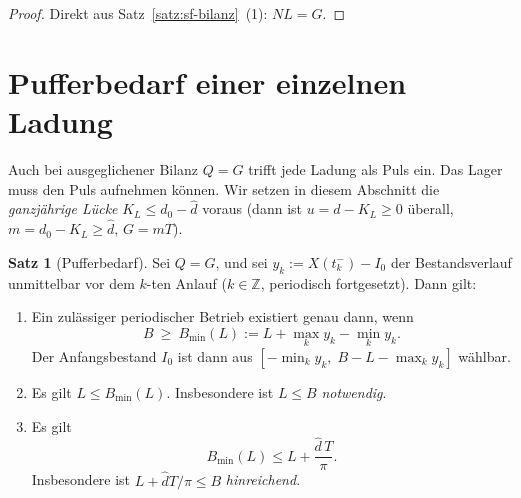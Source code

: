 \documentclass[a4paper, 12pt, twoside, openright]{report}
\providecommand{\dhat}{\hat d}      %
\theoremstyle{definition}
\theoremstyle{definition}
\newtheorem{satz}{Satz}[chapter]
\begin{document}
\begin{proof}
Direkt aus Satz~\ref{satz:sf-bilanz}~(1): $NL=G$.
\end{proof}

\section{Pufferbedarf einer einzelnen Ladung}\label{sec:sf-puffer}

Auch bei ausgeglichener Bilanz $Q=G$ trifft jede Ladung als Puls ein. Das Lager muss
den Puls aufnehmen können. Wir setzen in diesem Abschnitt die \emph{ganzjährige
Lücke} $K_L\le d_0-\dhat$ voraus (dann ist $u=d-K_L\ge0$ überall,
$m=d_0-K_L\ge\dhat$, $G=mT$).

\begin{satz}[Pufferbedarf]\label{satz:sf-puffer}
Sei $Q=G$, und sei $y_k:=X(t_k^-)-I_0$ der Bestandsverlauf unmittelbar vor dem
$k$-ten Anlauf ($k\in\mathbb Z$, periodisch fortgesetzt). Dann gilt:
\begin{enumerate}
  \item Ein zulässiger periodischer Betrieb existiert genau dann, wenn
    \begin{equation}
      B\ \ge\ B_{\min}(L):=L+\max_k y_k-\min_k y_k .
      \label{eq:sf-Bmin}
    \end{equation}
    Der Anfangsbestand $I_0$ ist dann aus $[-\min_k y_k,\;B-L-\max_k y_k]$ wählbar.
  \item Es gilt $L\le B_{\min}(L)$. Insbesondere ist $L\le B$ \emph{notwendig}.
  \item Es gilt
    \begin{equation}
      B_{\min}(L)\le L+\frac{\dhat\,T}{\pi}.
      \label{eq:sf-Bobere}
    \end{equation}
    Insbesondere ist $L+\dhat T/\pi\le B$ \emph{hinreichend}.
\end{enumerate}
\end{satz}
\end{document}
